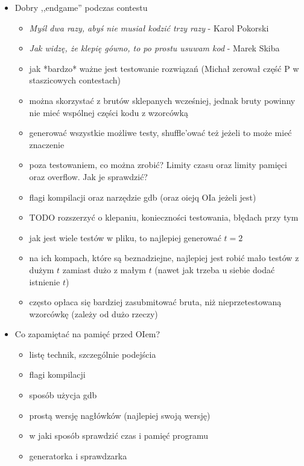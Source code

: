 \documentclass{article}
\begin{document}
\begin{itemize}
    \item Dobry ,,endgame'' podczas contestu
    \begin{itemize}
        \item \textit{Myśl dwa razy, abyś nie musiał kodzić trzy razy} - Karol Pokorski
        \item \textit{Jak widzę, że klepię gówno, to po prostu usuwam kod} - Marek Skiba
        \item jak *bardzo* ważne jest testowanie rozwiązań (Michał zerował część P w staszicowych contestach)
        \item można skorzystać z brutów sklepanych wcześniej, jednak bruty powinny nie mieć wspólnej części kodu z wzorcówką
        \item generować wszystkie możliwe testy, shuffle'ować też jeżeli to może mieć znaczenie 
        \item poza testowaniem, co można zrobić? Limity czasu oraz limity pamięci oraz overflow. Jak je sprawdzić?
        \item flagi kompilacji oraz narzędzie gdb (oraz oiejq OIa jeżeli jest)
        \item TODO rozszerzyć o klepaniu, konieczności testowania, błędach przy tym
        \item jak jest wiele testów w pliku, to najlepiej generować $t=2$
        \item na ich kompach, które są beznadziejne, najlepiej jest robić mało testów z dużym $t$ zamiast dużo z małym $t$ (nawet jak trzeba u siebie dodać istnienie $t$)
        \item często opłaca się bardziej zasubmitować bruta, niż nieprzetestowaną wzorcówkę (zależy od dużo rzeczy)
    \end{itemize}
    
    \item Co zapamiętać na pamięć przed OIem?
    \begin{itemize}
        \item listę technik, szczególnie podejścia
        \item flagi kompilacji
        \item sposób użycja gdb
        \item prostą wersję nagłówków (najlepiej swoją wersję)
        \item w jaki sposób sprawdzić czas i pamięć programu
        \item generatorka i sprawdzarka
    \end{itemize}
    

\end{itemize}
\end{document}
